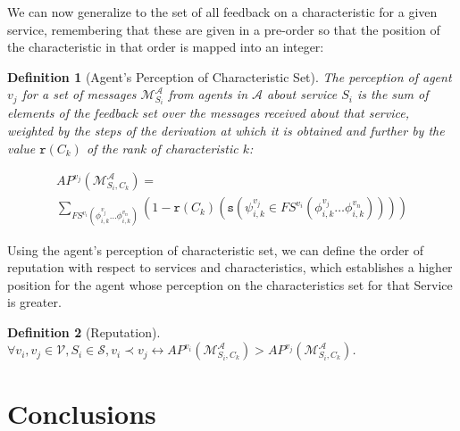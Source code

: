 \documentclass[compsoc, conference, letterpaper, 10pt, times]{IEEEtran}
\newtheorem{definition}{Definition}
\begin{document}
We can now generalize to the set of all feedback on a characteristic for a given service, remembering that these are given in a pre-order so that the position of the characteristic in that order is mapped into an integer:


\begin{definition}[Agent's Perception of Characteristic Set]
The perception of agent $v_{j}$ for a set of messages $\mathcal{M}^{\mathcal{A}}_{S_{i}}$ from agents in $\mathcal{A}$ about service $S_{i}$ 
is the sum of elements of the feedback set over the messages received about that service, weighted by the steps of the derivation at which it is obtained and further by the value $\mathtt{r}(C_{k})$ of the rank of characteristic $k$: 


\begin{displaymath}
\begin{array}{l}

AP^{v_{j}}(\mathcal{M}^{\mathcal{A}}_{S_{i}, C_{k}})=\\
\sum_{FS^{v_{i}}(\phi^{v_{j}}_{i,k}\dots \phi^{v_{n}}_{i,k})}
(1-\mathtt{r}(C_{k})(\mathtt{s}(\psi^{v_{j}}_{i,k} \in FS^{v_{i}}(\phi^{v_{j}}_{i,k}\dots \phi^{v_{n}}_{i,k}))))
\end{array}
\end{displaymath}

\end{definition}


Using the agent's perception of characteristic set, we can define the order of reputation with respect to services and characteristics, which establishes a higher position for the agent whose perception on the characteristics set for that Service is greater.

\begin{definition}[Reputation]
$\forall v_{i}, v_{j}\in \mathcal{V}, S_{i}\in \mathcal{S}, v_{i}\prec v_{j} \leftrightarrow AP^{v_{i}}(\mathcal{M}^{\mathcal{A}}_{S_{i}, C_{k}})>AP^{v_{j}}(\mathcal{M}^{\mathcal{A}}_{S_{i}, C_{k}})$.
\end{definition}

\section{Conclusions}
\end{document}
